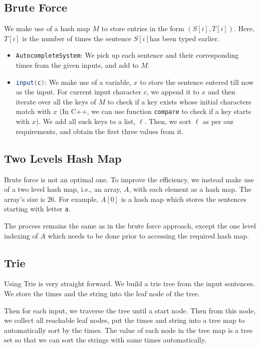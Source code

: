 \subsection{Brute Force}
We make use of a hash map $M$ to store entries in the form $(S[i], T[i])$. Here, $T[i]$ is the number of times the sentence $S[i]$​ has been typed earlier.

\begin{itemize}
\item \lstinline[language=Java, basicstyle=\small\ttfamily, keywordstyle=\bfseries\color{green!40!black}]|AutocompleteSystem|: We pick up each sentence  and their corresponding times from the given inputs, and add to $M$.

\item \lstinline[language=Java, basicstyle=\small\ttfamily, keywordstyle=\bfseries\color{green!40!black}]|input(c)|: We make use of a variable, $x$ to store the sentence entered till now as the input. For current input character $c$, we append it to $x$ and then iterate over all the keys of $M$ to check if a key exists whose initial characters match with $x$ (In C++, we can use function \lstinline[language=Java, basicstyle=\small\ttfamily, keywordstyle=\bfseries\color{green!40!black}]|compare| to check if a key starts with $x$). We add all such keys to a list, $\ell$. Then, we sort $\ell$ as per our requirements, and obtain the first three values from it.
\end{itemize}

\subsection{Two Levels Hash Map}
Brute force is not an optimal one. To improve the efficiency, we instead make use of a two level hash map, i.e., an array, $A$, with each element as a hash map. The array's size is 26. For example, $A[0]$ is a hash map which stores the sentences starting with letter \texttt{a}.

The process remains the same as in the brute force approach, except the one level indexing of $A$ which needs to be done prior to accessing the required hash map.

\subsection{Trie}
Using Trie is very straight forward. We build a trie tree from the input sentences. We store the times and the string into the leaf node of the tree. 

Then for each input, we traverse the tree until a start node. Then from this node, we collect all reachable leaf nodes, put the times and string into a tree map to automatically sort by the times. The value of each node in the tree map is a tree set so that we can sort the strings with same times automatically. 